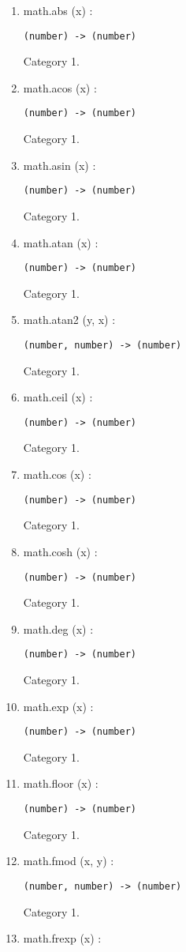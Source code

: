 \begin{enumerate}
\item math.abs (x) :
\begin{verbatim}
(number) -> (number)
\end{verbatim}
Category 1.
\item math.acos (x) :
\begin{verbatim}
(number) -> (number)
\end{verbatim}
Category 1.
\item math.asin (x) :
\begin{verbatim}
(number) -> (number)
\end{verbatim}
Category 1.
\item math.atan (x) :
\begin{verbatim}
(number) -> (number)
\end{verbatim}
Category 1.
\item math.atan2 (y, x) :
\begin{verbatim}
(number, number) -> (number)
\end{verbatim}
Category 1.
\item math.ceil (x) :
\begin{verbatim}
(number) -> (number)
\end{verbatim}
Category 1.
\item math.cos (x) :
\begin{verbatim}
(number) -> (number)
\end{verbatim}
Category 1.
\item math.cosh (x) :
\begin{verbatim}
(number) -> (number)
\end{verbatim}
Category 1.
\item math.deg (x) :
\begin{verbatim}
(number) -> (number)
\end{verbatim}
Category 1.
\item math.exp (x) :
\begin{verbatim}
(number) -> (number)
\end{verbatim}
Category 1.
\item math.floor (x) :
\begin{verbatim}
(number) -> (number)
\end{verbatim}
Category 1.
\item math.fmod (x, y) :
\begin{verbatim}
(number, number) -> (number)
\end{verbatim}
Category 1.
\item math.frexp (x) :

\end{enumerate}

